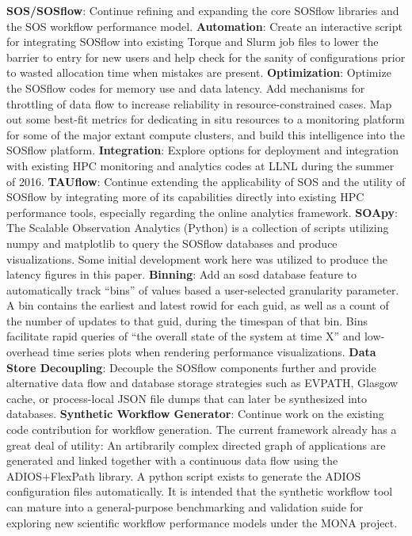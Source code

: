 \textbf{SOS/SOSflow}: Continue refining and expanding the core SOSflow
libraries and the SOS workflow performance model.
%
\textbf{Automation}: Create an interactive script for integrating
SOSflow into existing Torque and Slurm job files to lower the barrier
to entry for new users and help check for the sanity of configurations
prior to wasted allocation time when mistakes are present.
%
\textbf{Optimization}: Optimize the SOSflow codes for memory use and
data latency. Add mechanisms for throttling of data flow to increase
reliability in resource-constrained cases.
%
Map out some best-fit metrics for dedicating in situ resources to a
monitoring platform for some of the major extant compute clusters, and
build this intelligence into the SOSflow platform.
%
\textbf{Integration}: Explore options for deployment and integration
with existing HPC monitoring and analytics codes at LLNL during the
summer of 2016.
%
\textbf{TAUflow}: Continue extending the applicability of SOS and
the utility of SOSflow by integrating more of its capabilities directly
into existing HPC performance tools, especially regarding the online
analytics framework.
%
\textbf{SOApy}: The Scalable Observation Analytics (Python) is a 
collection of scripts utilizing numpy and matplotlib to query the
SOSflow databases and produce visualizations.
%
Some initial development work here was utilized to produce the latency
figures in this paper.
%
\textbf{Binning}: Add an sosd database feature to automatically
track ``bins'' of values based a user-selected granularity
parameter.
%
A bin contains the earliest and latest rowid for each guid, as well as
a count of the number of updates to that guid, during the timespan of
that bin.
%
Bins facilitate rapid queries of ``the overall state of the system at
time X'' and low-overhead time series plots when rendering performance
visualizations.
%
\textbf{Data Store Decoupling}: Decouple the SOSflow components further
and provide alternative data flow and database storage strategies such
as EVPATH, Glasgow cache, or process-local JSON file dumps that can
later be synthesized into databases.
%
\textbf{Synthetic Workflow Generator}: Continue work on the existing
code contribution for workflow generation.
%
The current framework already has a great deal of utility: An
artibrarily complex directed graph of applications are generated and
linked together with a continuous data flow using the ADIOS+FlexPath
library.
%
A python script exists to generate the ADIOS configuration files
automatically.
%
It is intended that the synthetic workflow tool can mature into a
general-purpose benchmarking and validation suide for exploring new
scientific workflow performance models under the MONA project.

